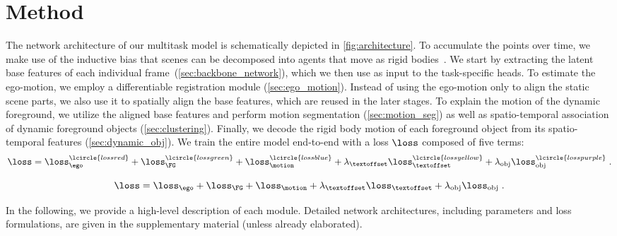 \section{Method}
\label{sec:method}


The network architecture of our multitask model is schematically depicted in \cref{fig:architecture}. To accumulate the points over time, we make use of the inductive bias that scenes can be decomposed into agents that move as rigid bodies~\cite{gojcic2021weakly}. We start by extracting the latent base features of each individual frame~(\cref{sec:backbone_network}), which we then use as input to the task-specific heads. To estimate the ego-motion, we employ a differentiable registration module (\cref{sec:ego_motion}). Instead of using the ego-motion only to align the static scene parts, we also use it to spatially align the base features, which are reused in the later stages. To explain the motion of the dynamic foreground, we utilize the aligned base features and perform motion segmentation (\cref{sec:motion_seg}) as well as spatio-temporal association of dynamic foreground objects (\cref{sec:clustering}). Finally, we decode the rigid body motion of each foreground object from its spatio-temporal features (\cref{sec:dynamic_obj}). We train the entire model end-to-end with a loss $\loss$ composed of five terms: 
\begin{equation}
    \loss = \loss_\ego^\lcircle{lossred} + \loss_\FG^\lcircle{lossgreen} + \loss_\motion^\lcircle{lossblue} + \lambda_\textoffset\loss_\textoffset^\lcircle{lossyellow} + \lambda_{\text{obj}}\loss_{\text{obj}}^\lcircle{losspurple}\;.
    \label{eq:loss}
\end{equation}

\begin{equation}
    \loss = \loss_\ego + \loss_\FG + \loss_\motion + \lambda_\textoffset\loss_\textoffset + \lambda_{\text{obj}}\loss_{\text{obj}}\;.
\end{equation}

In the following, we provide a high-level description of each module. 
Detailed network architectures, including parameters and loss formulations, are given in the supplementary material (unless already elaborated).

